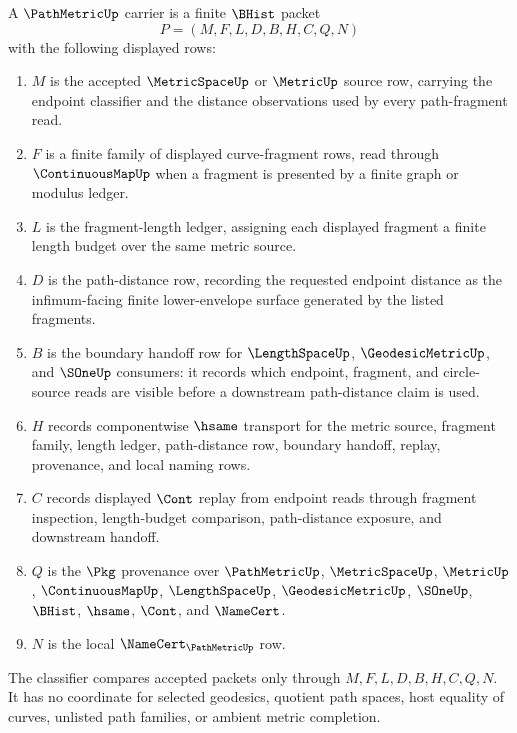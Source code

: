 \begin{definition}
\label{def:path-metric-carrier}
A $\PathMetricUp$ carrier is a finite $\BHist$ packet
$$
P=(M,F,L,D,B,H,C,Q,N)
$$
with the following displayed rows:
\begin{enumerate}
\item $M$ is the accepted $\MetricSpaceUp$ or $\MetricUp$ source row, carrying the endpoint classifier and the distance observations used by every path-fragment read.
\item $F$ is a finite family of displayed curve-fragment rows, read through $\ContinuousMapUp$ when a fragment is presented by a finite graph or modulus ledger.
\item $L$ is the fragment-length ledger, assigning each displayed fragment a finite length budget over the same metric source.
\item $D$ is the path-distance row, recording the requested endpoint distance as the infimum-facing finite lower-envelope surface generated by the listed fragments.
\item $B$ is the boundary handoff row for $\LengthSpaceUp$, $\GeodesicMetricUp$, and $\SOneUp$ consumers: it records which endpoint, fragment, and circle-source reads are visible before a downstream path-distance claim is used.
\item $H$ records componentwise $\hsame$ transport for the metric source, fragment family, length ledger, path-distance row, boundary handoff, replay, provenance, and local naming rows.
\item $C$ records displayed $\Cont$ replay from endpoint reads through fragment inspection, length-budget comparison, path-distance exposure, and downstream handoff.
\item $Q$ is the $\Pkg$ provenance over $\PathMetricUp$, $\MetricSpaceUp$, $\MetricUp$, $\ContinuousMapUp$, $\LengthSpaceUp$, $\GeodesicMetricUp$, $\SOneUp$, $\BHist$, $\hsame$, $\Cont$, and $\NameCert$.
\item $N$ is the local $\NameCert_{\PathMetricUp}$ row.
\end{enumerate}
The classifier compares accepted packets only through $M,F,L,D,B,H,C,Q,N$. It has no coordinate for selected geodesics, quotient path spaces, host equality of curves, unlisted path families, or ambient metric completion.
\end{definition}

